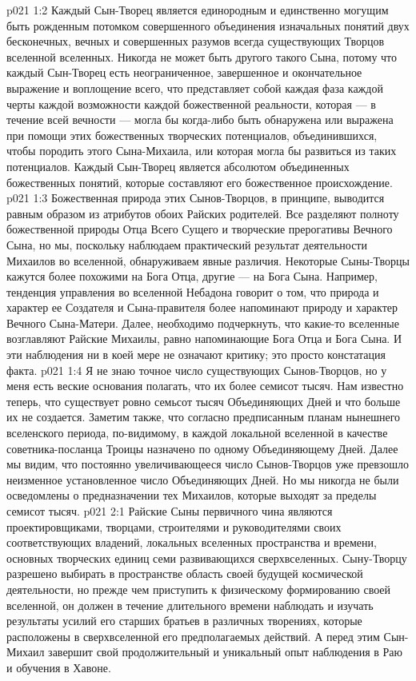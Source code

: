 \vs p021 1:2 Каждый Сын\hyp{}Творец является единородным и единственно могущим быть рожденным потомком совершенного объединения изначальных понятий двух бесконечных, вечных и совершенных разумов всегда существующих Творцов вселенной вселенных. Никогда не может быть другого такого Сына, потому что каждый Сын\hyp{}Творец есть неограниченное, завершенное и окончательное выражение и воплощение всего, что представляет собой каждая фаза каждой черты каждой возможности каждой божественной реальности, которая --- в течение всей вечности --- могла бы когда\hyp{}либо быть обнаружена или выражена при помощи этих божественных творческих потенциалов, объединившихся, чтобы породить этого Сына\hyp{}Михаила, или которая могла бы развиться из таких потенциалов. Каждый Сын\hyp{}Творец является абсолютом объединенных божественных понятий, которые составляют его божественное происхождение.
\vs p021 1:3 Божественная природа этих Сынов\hyp{}Творцов, в принципе, выводится равным образом из атрибутов обоих Райских родителей. Все разделяют полноту божественной природы Отца Всего Сущего и творческие прерогативы Вечного Сына, но мы, поскольку наблюдаем практический результат деятельности Михаилов во вселенной, обнаруживаем явные различия. Некоторые Сыны\hyp{}Творцы кажутся более похожими на Бога Отца, другие --- на Бога Сына. Например, тенденция управления во вселенной Небадона говорит о том, что природа и характер ее Создателя и Сына\hyp{}правителя более напоминают природу и характер Вечного Сына\hyp{}Матери. Далее, необходимо подчеркнуть, что какие\hyp{}то вселенные возглавляют Райские Михаилы, равно напоминающие Бога Отца и Бога Сына. И эти наблюдения ни в коей мере не означают критику; это просто констатация факта.
\vs p021 1:4 Я не знаю точное число существующих Сынов\hyp{}Творцов, но у меня есть веские основания полагать, что их более семисот тысяч. Нам известно теперь, что существует ровно семьсот тысяч Объединяющих Дней и что больше их не создается. Заметим также, что согласно предписанным планам нынешнего вселенского периода, по\hyp{}видимому, в каждой локальной вселенной в качестве советника\hyp{}посланца Троицы назначено по одному Объединяющему Дней. Далее мы видим, что постоянно увеличивающееся число Сынов\hyp{}Творцов уже превзошло неизменное установленное число Объединяющих Дней. Но мы никогда не были осведомлены о предназначении тех Михаилов, которые выходят за пределы семисот тысяч.
\vs p021 2:1 Райские Сыны первичного чина являются проектировщиками, творцами, строителями и руководителями своих соответствующих владений, локальных вселенных пространства и времени, основных творческих единиц семи развивающихся сверхвселенных. Сыну\hyp{}Творцу разрешено выбирать в пространстве область своей будущей космической деятельности, но прежде чем приступить к физическому формированию своей вселенной, он должен в течение длительного времени наблюдать и изучать результаты усилий его старших братьев в различных творениях, которые расположены в сверхвселенной его предполагаемых действий. А перед этим Сын\hyp{}Михаил завершит свой продолжительный и уникальный опыт наблюдения в Раю и обучения в Хавоне.
